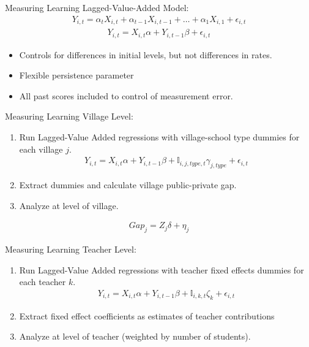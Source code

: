 \documentclass[handout]{beamer}
\begin{document}
\begin{frame}{Measuring Learning}
	Lagged-Value-Added Model:	
	\begin{eqnarray}
		Y_{i,t}=\alpha_tX_{i,t}+\alpha_{t-1}X_{i,t-1}+ \dots + \alpha_1X_{i,1} + \epsilon_{i,t}
	\end{eqnarray}
	\pause
	\begin{eqnarray}
		Y_{i,t}=X_{i,t}\alpha+Y_{i,t-1}\beta + \epsilon_{i,t}\label{primary}
	\end{eqnarray}
	\begin{itemize}
		\item Controls for differences in initial levels, but not differences in rates. 
		\item Flexible persistence parameter
		\item All past scores included to control of measurement error.
	\end{itemize}
\end{frame}

\begin{frame}{Measuring Learning}
	Village Level:
	\begin{enumerate}
		\item Run Lagged-Value Added regressions with village-school type dummies for each village $j$.
		\begin{eqnarray*}
			Y_{i,t}=X_{i,t}\alpha+Y_{i,t-1}\beta + \mathbb{I}_{i,j,type,t}\gamma_{j, type}+\epsilon_{i,t}
		\end{eqnarray*}
		\item Extract dummies and calculate village public-private gap.
		\item Analyze at level of village.
	\end{enumerate}
	\begin{eqnarray*}
		Gap_{j}=Z_{j}\delta+\eta_{j}\label{villagespecification}
	\end{eqnarray*}
\end{frame} 

\begin{frame}{Measuring Learning}
	Teacher Level:
	\begin{enumerate}
		\item Run Lagged-Value Added regressions with teacher fixed effects dummies for each teacher $k$.
		\begin{eqnarray*}
			Y_{i,t}=X_{i,t}\alpha+Y_{i,t-1}\beta + \mathbb{I}_{i,k,t}\zeta_{k}+\epsilon_{i,t}\label{teacherspecification}
		\end{eqnarray*}
		
		\item Extract fixed effect coefficients as estimates of teacher contributions
		\item Analyze at level of teacher (weighted by number of students).
	\end{enumerate}
\end{frame}
\end{document}
